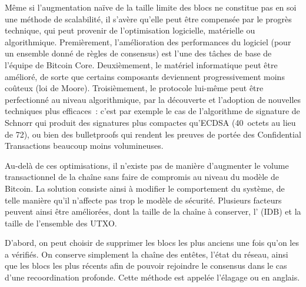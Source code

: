 Même si l'augmentation naïve de la taille limite des blocs ne constitue pas en soi une méthode de scalabilité, il s'avère qu'elle peut être compensée par le progrès technique, qui peut provenir de l'optimisation logicielle, matérielle ou algorithmique. Premièrement, l'amélioration des performances du logiciel (pour un ensemble donné de règles de consensus) est l'une des tâches de base de l'équipe de Bitcoin Core. Deuxièmement, le matériel informatique peut être amélioré, de sorte que certains composants deviennent progressivement moins coûteux (loi de Moore). Troisièmement, le protocole lui-même peut être perfectionné au niveau algorithmique, par la découverte et l'adoption de nouvelles techniques plus efficaces~: c'est par exemple le cas de l'algorithme de signature de Schnorr qui produit des signatures plus compactes qu'ECDSA (40~octets au lieu de 72), ou bien des bulletproofs qui rendent les preuves de portée des Confidential Transactions beaucoup moins volumineuses.

Au-delà de ces optimisations, il n'existe pas de manière d'augmenter le volume transactionnel de la chaîne sans faire de compromis au niveau du modèle de Bitcoin. La solution consiste ainsi à modifier le comportement du système, de telle manière qu'il n'affecte pas trop le modèle de sécurité. Plusieurs facteurs peuvent ainsi être améliorées, dont la taille de la chaîne à conserver, l' (IDB) et la taille de l'ensemble des UTXO.

D'abord, on peut choisir de supprimer les blocs les plus anciens une fois qu'on les a vérifiés. On conserve simplement la chaîne des entêtes, l'état du réseau, ainsi que les blocs les plus récents afin de pouvoir rejoindre le consensus dans le cas d'une recoordination profonde. Cette méthode est appelée l'élagage ou  en anglais.

